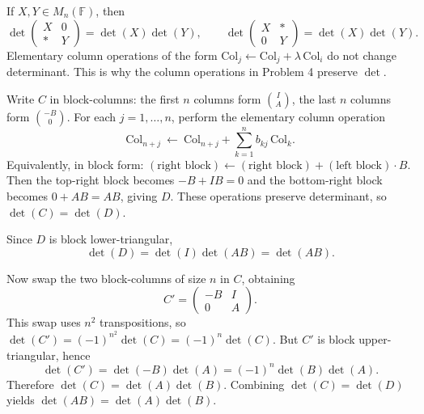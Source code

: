 \begin{problem}[CP-I-0080]
If \(X,Y\in M_n(\mathbb F)\), then
\[
\det\begin{pmatrix}X&0\\ *&Y\end{pmatrix}=\det(X)\det(Y),
\qquad
\det\begin{pmatrix}X&*\\ 0&Y\end{pmatrix}=\det(X)\det(Y).
\]
Elementary column operations of the form \(\mathrm{Col}_j\leftarrow \mathrm{Col}_j+\lambda\,\mathrm{Col}_i\) do not change determinant.
This is why the column operations in Problem 4 preserve \(\det\).\end{problem}

\begin{solution}
Write \(C\) in block-columns:
the first \(n\) columns form \(\binom{I}{A}\), the last \(n\) columns form \(\binom{-B}{0}\).
For each \(j=1,\dots,n\), perform the elementary column operation
\[
\mathrm{Col}_{n+j}\ \leftarrow\ \mathrm{Col}_{n+j}+\sum_{k=1}^n b_{kj}\,\mathrm{Col}_k.
\]
Equivalently, in block form: \((\text{right block})\leftarrow(\text{right block})+(\text{left block})\cdot B\).
Then the top-right block becomes \(-B+IB=0\) and the bottom-right block becomes \(0+AB=AB\), giving \(D\).
These operations preserve determinant, so \(\det(C)=\det(D)\).

Since \(D\) is block lower-triangular,
\[
\det(D)=\det(I)\det(AB)=\det(AB).
\]

Now swap the two block-columns of size \(n\) in \(C\), obtaining
\[
C'=\begin{pmatrix}-B&I\\ 0&A\end{pmatrix}.
\]
This swap uses \(n^2\) transpositions, so \(\det(C')=(-1)^{n^2}\det(C)=(-1)^n\det(C)\).
But \(C'\) is block upper-triangular, hence
\[
\det(C')=\det(-B)\det(A)=(-1)^n\det(B)\det(A).
\]
Therefore \(\det(C)=\det(A)\det(B)\).
Combining \(\det(C)=\det(D)\) yields \(\det(AB)=\det(A)\det(B)\).
\end{solution}

